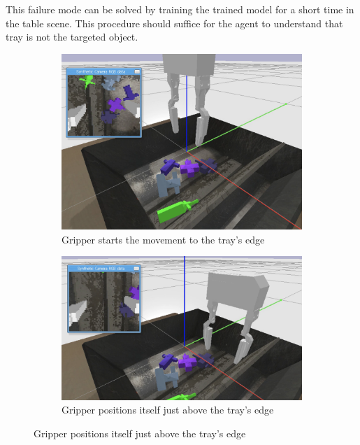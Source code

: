 \begin{enumerate}
    This failure mode can be solved by training the trained model for a short time in the table scene. This procedure should suffice for the agent to understand that tray is not the targeted object.
    \begin{figure}[!htbp]
        \begin{subfigure}{0.33\textwidth}
            \includegraphics[width=\linewidth]{figures/failure/trayedge1}
            \caption{Gripper starts the movement to the tray's edge} \label{fig:table}
        \end{subfigure}%
        \hspace*{\fill}   %
        \begin{subfigure}{0.35\textwidth}
            \includegraphics[width=\linewidth]{figures/failure/trayedge2}
            \caption{Gripper positions itself just above the tray's edge} \label{fig:floor}

\end{subfigure}
\end{figure}
\end{enumerate}
